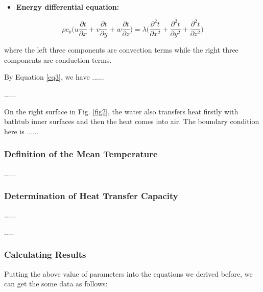 \documentclass{mcmthesis}
\begin{document}
\begin{itemize}
    \item {\bf Energy differential equation:}
\end{itemize}

\begin{equation} \label{eq3}
    \rho c_p \Big( u\frac{\partial t}{\partial x} + v\frac{\partial t}{\partial y} +
    w\frac{\partial t}{\partial z} \Big) = \lambda \Big(\frac{\partial^2 t}{\partial x^2} +
    \frac{\partial^2 t}{\partial y^2} + \frac{\partial^2 t}{\partial z^2} \Big)
\end{equation}

\noindent where the left three components are convection terms while the right
three components are conduction terms.

By Equation \eqref{eq3}, we have ......

......

On the right surface in Fig. \ref{fig2}, the water also transfers heat firstly
with bathtub inner surfaces and then the heat comes into air. The boundary
condition here is ......

\subsubsection{Definition of the Mean Temperature}

......

\subsubsection{Determination of Heat Transfer Capacity}

......


.....

\subsubsection{Calculating Results}

Putting the above value of parameters into the equations we derived before, we
can get the some data as follows:
\end{document}
